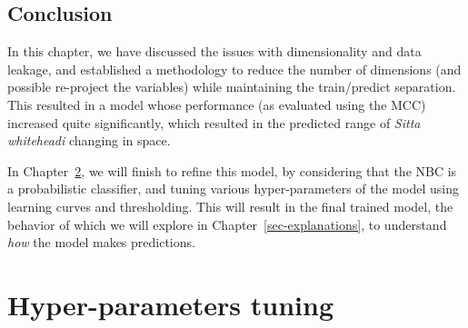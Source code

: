 \documentclass[
  letterpaper,
]{scrbook}
\begin{document}
{
\makeatletter
\def\LT@makecaption#1#2#3{%
  \noalign{\smash{\hbox{\kern\textwidth\rlap{\kern\marginparsep
  \parbox[t]{\marginparwidth}{%
    \footnotesize{%
      \vspace{(1.1\baselineskip)}
    #1{#2: }\ignorespaces #3}}}}}}%
    }
\makeatother

\begin{figure}[bt]



\end{figure}%

}

\section{Conclusion}\label{conclusion-4}

In this chapter, we have discussed the issues with dimensionality and
data leakage, and established a methodology to reduce the number of
dimensions (and possible re-project the variables) while maintaining the
train/predict separation. This resulted in a model whose performance (as
evaluated using the MCC) increased quite significantly, which resulted
in the predicted range of \emph{Sitta whiteheadi} changing in space.

In Chapter~\ref{sec-tuning}, we will finish to refine this model, by
considering that the NBC is a probabilistic classifier, and tuning
various hyper-parameters of the model using learning curves and
thresholding. This will result in the final trained model, the behavior
of which we will explore in Chapter~\ref{sec-explanations}, to
understand \emph{how} the model makes predictions.


\chapter{Hyper-parameters tuning}\label{sec-tuning}
\end{document}
